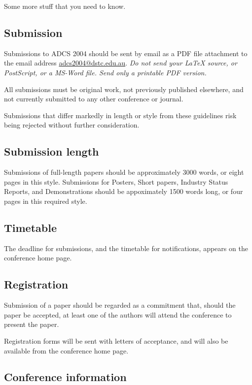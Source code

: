\documentclass[twocolumn]{article}
\begin{document}
Some more stuff that you need to know.

\subsection{Submission}

Submissions to ADCS 2004 should be sent by email as a PDF file
attachment to the email address \url{adcs2004@dstc.edu.au}.
\emph{Do not send your {\LaTeX} source, or PostScript, or a MS-Word
file.
Send only a printable PDF version.}

All submissions must be original work, not previously published 
elsewhere, and not currently submitted to any other conference or
journal.

Submissions that differ markedly in length or style from these
guidelines risk being rejected without further consideration.

\subsection{Submission length}

Submissions of full-length papers should be approximately 3000 words,
or eight pages in this style.
Submissions for Posters, Short papers, Industry Status Reports, and
Demonstrations should be appoximately 1500 words long, or four pages
in this required style.

\subsection{Timetable}

The deadline for submissions, and the timetable for notifications,
appears on the conference home page.

\subsection{Registration}

Submission of a paper should be regarded as a commitment that, should
the paper be accepted, at least one of the authors will attend the
conference to present the paper.

Registration forms will be sent with letters of acceptance, and will
also be available from the conference home page.


\subsection{Conference information}
\end{document}
